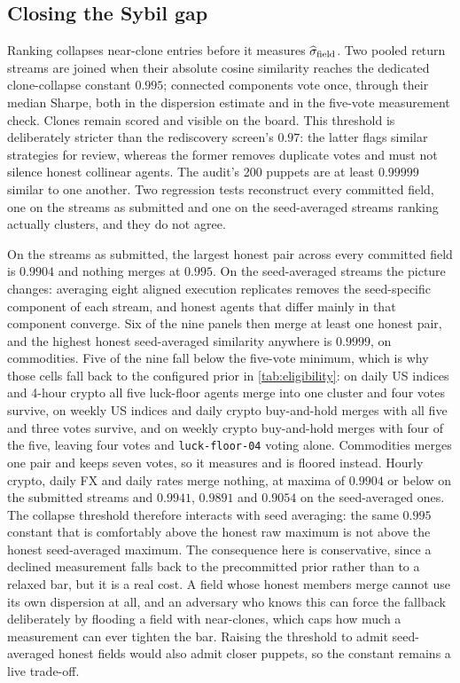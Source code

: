 \subsection{Closing the Sybil gap}\label{sec:sybil}

Ranking collapses near-clone entries before it measures $\widehat\sigma_{\rm field}$. Two pooled return streams are joined when their absolute cosine similarity reaches the dedicated clone-collapse constant $0.995$; connected components vote once, through their median Sharpe, both in the dispersion estimate and in the five-vote measurement check. Clones remain scored and visible on the board. This threshold is deliberately stricter than the rediscovery screen's $0.97$: the latter flags similar strategies for review, whereas the former removes duplicate votes and must not silence honest collinear agents. The audit's 200 puppets are at least $0.99999$ similar to one another. Two regression tests reconstruct every committed field, one on the streams as submitted and one on the seed-averaged streams ranking actually clusters, and they do not agree.

On the streams as submitted, the largest honest pair across every committed field is $0.9904$ and nothing merges at $0.995$. On the seed-averaged streams the picture changes: averaging eight aligned execution replicates removes the seed-specific component of each stream, and honest agents that differ mainly in that component converge. Six of the nine panels then merge at least one honest pair, and the highest honest seed-averaged similarity anywhere is $0.9999$, on commodities. Five of the nine fall below the five-vote minimum, which is why those cells fall back to the configured prior in \cref{tab:eligibility}: on daily US indices and 4-hour crypto all five luck-floor agents merge into one cluster and four votes survive, on weekly US indices and daily crypto buy-and-hold merges with all five and three votes survive, and on weekly crypto buy-and-hold merges with four of the five, leaving four votes and \texttt{luck-floor-04} voting alone. Commodities merges one pair and keeps seven votes, so it measures and is floored instead. Hourly crypto, daily FX and daily rates merge nothing, at maxima of $0.9904$ or below on the submitted streams and $0.9941$, $0.9891$ and $0.9054$ on the seed-averaged ones. The collapse threshold therefore interacts with seed averaging: the same $0.995$ constant that is comfortably above the honest raw maximum is not above the honest seed-averaged maximum. The consequence here is conservative, since a declined measurement falls back to the precommitted prior rather than to a relaxed bar, but it is a real cost. A field whose honest members merge cannot use its own dispersion at all, and an adversary who knows this can force the fallback deliberately by flooding a field with near-clones, which caps how much a measurement can ever tighten the bar. Raising the threshold to admit seed-averaged honest fields would also admit closer puppets, so the constant remains a live trade-off.

